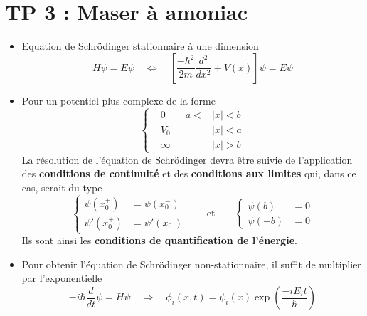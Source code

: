 \section*{TP 3 : Maser à amoniac}
\begin{itemize}
	\item Equation de Schrödinger stationnaire à une dimension 
		\begin{equation}
			H\psi = E\psi \quad \Leftrightarrow \quad \left[\frac{-\hbar ^2}{2m}\frac{d^2}{dx^2} + V(x)\right]\psi = E \psi
		\end{equation}
		\item Pour un potentiel plus complexe de la forme 
			\begin{equation}
				\left\{ 
				\begin{aligned}
				&0 \qquad a< &|x| <b \\
				&V_0 \qquad &|x|<a \\
				&\infty \qquad &|x|>b
				\end{aligned}
				\right.
			\end{equation}
			La résolution de l'équation de Schrödinger devra être suivie de l'application des \textbf{conditions de continuité} et des \textbf{conditions aux limites} qui, dans ce cas, serait du type
				\begin{equation}
				\left\{ 
				\begin{aligned}
				\psi (x_0^+) &= \psi (x_0^-) \\
				\psi '(x_0^+) &= \psi '(x_0^-)
				\end{aligned}
				\right.
				\qquad
				\mbox{et}
				\qquad 
				\left\{ 
				\begin{aligned}
				\psi (b) &= 0 \\
				\psi (-b) &= 0
				\end{aligned}
				\right.
				\end{equation}
				Ils sont ainsi les \textbf{conditions de quantification de l'énergie}.
		
		\item Pour obtenir l'équation de Schrödinger non-stationnaire, il suffit de multiplier par l'exponentielle
			\begin{equation}
				-i\hbar \frac{d}{dt}\psi = H \psi \quad \Rightarrow \quad \phi _i(x,t) = \psi _i (x) \exp \left( \frac{-iE_i t}{\hbar}\right) 
			\end{equation}
\end{itemize}

